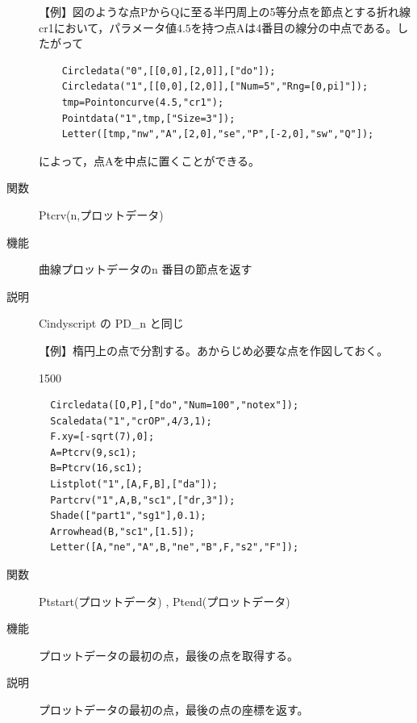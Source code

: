 \documentclass[papersize,a4paper,12pt,uplatex]{jsarticle}
\begin{document}
\begin{description}
\vspace{\baselineskip}
【例】図のような点$\mathrm{P}$から$\mathrm{Q}$に至る半円周上の5等分点を節点とする折れ線cr1において，パラメータ値$4.5$を持つ点$\mathrm{A}$は4番目の線分の中点である。したがって

\begin{verbatim}
    Circledata("0",[[0,0],[2,0]],["do"]);
    Circledata("1",[[0,0],[2,0]],["Num=5","Rng=[0,pi]"]);
    tmp=Pointoncurve(4.5,"cr1");
    Pointdata("1",tmp,["Size=3"]);
    Letter([tmp,"nw","A",[2,0],"se","P",[-2,0],"sw","Q"]);
\end{verbatim}
    
によって，点Aを中点に置くことができる。

\vspace{\baselineskip}
 \begin{center} \scalebox{0.9}{} \end{center}

\hypertarget{ptcrv}{}
\item[関数]  Ptcrv(n,プロットデータ)
\item[機能]  曲線プロットデータのn 番目の節点を返す
\item[説明]  Cindyscript の PD\_n と同じ

\vspace{\baselineskip}
【例】楕円上の点で分割する。あからじめ必要な点を作図しておく。

\begin{layer}{150}{0}
\end{layer}
\begin{verbatim}
  Circledata([O,P],["do","Num=100","notex"]);
  Scaledata("1","crOP",4/3,1);
  F.xy=[-sqrt(7),0];
  A=Ptcrv(9,sc1);
  B=Ptcrv(16,sc1);
  Listplot("1",[A,F,B],["da"]);
  Partcrv("1",A,B,"sc1",["dr,3"]);
  Shade(["part1","sg1"],0.1);
  Arrowhead(B,"sc1",[1.5]);
  Letter([A,"ne","A",B,"ne","B",F,"s2","F"]);
\end{verbatim}
   

\vspace{\baselineskip}
\hypertarget{ptstart}{}
\item[関数]  Ptstart(プロットデータ) , Ptend(プロットデータ)
\item[機能]  プロットデータの最初の点，最後の点を取得する。
\item[説明]  プロットデータの最初の点，最後の点の座標を返す。


\end{description}
\end{document}
